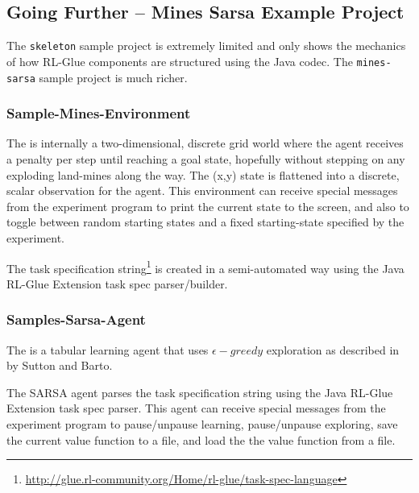 \documentclass[11pt]{article}
\begin{document}
\subsection{Going Further -- Mines Sarsa Example Project}
\label{mines-sarsa-sample}
The \texttt{skeleton} sample project is extremely limited and only shows the mechanics of how RL-Glue components are structured using the Java codec.  The \texttt{mines-sarsa} sample project is much richer.

\subsubsection{Sample-Mines-Environment}
\label{mines-sample}
The 
is internally a two-dimensional, discrete grid world where the agent receives a penalty per step until reaching a goal state, hopefully without stepping on any exploding land-mines along the way.  The (x,y) state is flattened into a discrete, scalar observation for the agent.  This environment can receive special messages from the experiment program to print the current state to the screen, and also to toggle between random starting states and a fixed starting-state specified by the experiment.

The task specification string\footnote{\url{http://glue.rl-community.org/Home/rl-glue/task-spec-language}} is created in a semi-automated way using the Java RL-Glue Extension task spec parser/builder. 

\subsubsection{Samples-Sarsa-Agent}
\label{sarsa-sample}
The 
is a tabular learning agent that uses $\epsilon-greedy$ exploration as described in  by Sutton and Barto.

The SARSA agent parses the task specification string using the Java RL-Glue Extension task spec parser.  This agent can receive special messages from the experiment program to pause/unpause learning, pause/unpause exploring, save the current value function to a file, and load the the value function from a file.
\end{document}
